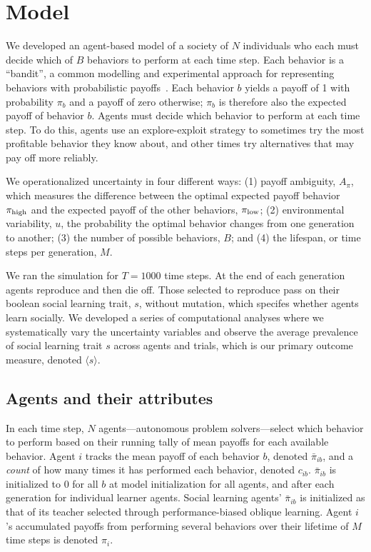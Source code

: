 \documentclass[letterpaper,11.5pt]{scrartcl}
\begin{document}
\section{Model}

We developed an agent-based model of a society of $N$ individuals who each must decide
which of $B$ behaviors to perform at each time step. Each behavior is a ``bandit'',
a common modelling and experimental approach for representing behaviors with
probabilistic payoffs~\cite{SuttonBartoBook, McElreath2005,Rendell2010,Schulz2019}. %
Each behavior $b$ yields a payoff of 1 with probability $\pi_b$ and a payoff of zero
otherwise; $\pi_b$ is therefore also the expected payoff of behavior $b$. Agents must
decide which behavior to perform at each time step. To do this, agents 
use an explore-exploit strategy to sometimes try the most profitable behavior
they know about, and other times try alternatives that may pay off more reliably. 

We operationalized uncertainty in four different ways: 
(1) payoff ambiguity, $A_\pi$, which measures the difference
between the optimal expected payoff behavior $\pi_{\mathrm{high}}$ and the expected payoff
of the other behaviors, $\pi_{\mathrm{low}}$; 
(2) environmental variability, $u$, the probability the optimal behavior changes from one generation to another; 
(3) the number of possible behaviors, $B$; and 
(4) the lifespan, or time steps per generation, $M$. 

We ran the simulation for $T=1000$ time steps. At
the end of each generation agents reproduce and then die off. 
Those selected to reproduce
pass on their boolean social learning trait, $s$, without mutation,
which specifes whether agents learn socially. We developed a series of
computational analyses where we systematically vary the uncertainty
variables and observe the average prevalence of social learning trait $s$
across agents and trials, which is our primary outcome measure, 
denoted $\langle s \rangle$. 

\subsection{Agents and their attributes}

In each time step, $N$ agents---autonomous problem solvers---select 
which behavior to perform based on their running tally of mean payoffs for 
each available behavior. %
Agent $i$ tracks the mean payoff of each behavior $b$, denoted $\bar\pi_{ib}$, and
a \emph{count} of how many times it has performed each behavior, denoted $c_{ib}$.
$\bar\pi_{ib}$
is initialized to 0 for all $b$ at model initialization for
all agents, and after each generation for individual learner agents. Social
learning agents' $\bar\pi_{ib}$ is initialized as that of its teacher selected
through performance-biased oblique learning. Agent $i$'s accumulated payoffs
from performing several behaviors over their lifetime of $M$ time steps is
denoted $\pi_{i}$.
\end{document}
